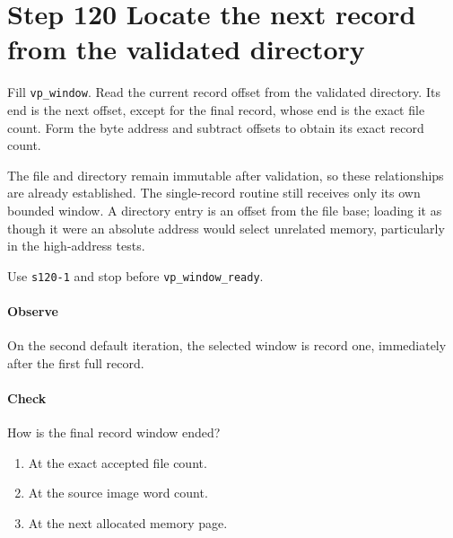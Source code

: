 \section{Step 120 Locate the next record from the validated directory}
Fill \texttt{vp\_window}. Read the current record offset from the validated directory. Its end is the next offset, except for the final record, whose end is the exact file count. Form the byte address and subtract offsets to obtain its exact record count.

The file and directory remain immutable after validation, so these relationships are already established. The single-record routine still receives only its own bounded window. A directory entry is an offset from the file base; loading it as though it were an absolute address would select unrelated memory, particularly in the high-address tests.

Use \texttt{s120-1} and stop before \texttt{vp\_window\_ready}.

\paragraph{Observe} On the second default iteration, the selected window is record one, immediately after the first full record.

\paragraph{Check} How is the final record window ended?
\begin{enumerate}[label=\Alph*.]
  \item At the exact accepted file count.
  \item At the source image word count.
  \item At the next allocated memory page.
\end{enumerate}
